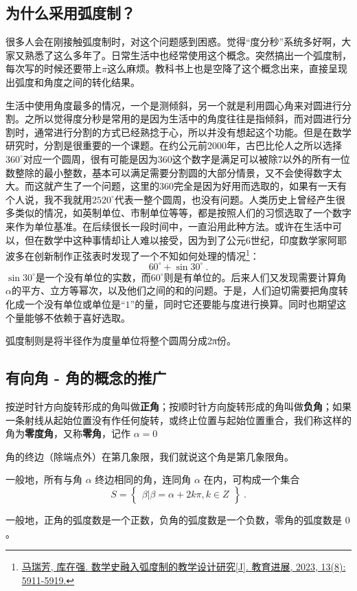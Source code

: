 \subsection{为什么采用弧度制？}

很多人会在刚接触弧度制时，对这个问题感到困惑。觉得“度分秒”系统多好啊，大家又熟悉了这么多年了。日常生活中也经常使用这个概念。突然搞出一个弧度制，每次写的时候还要带上$\pi$这么麻烦。教科书上也是空降了这个概念出来，直接呈现出弧度和角度之间的转化结果。

生活中使用角度最多的情况，一个是测倾斜，另一个就是利用圆心角来对圆进行分割。之所以觉得度分秒是常用的是因为生活中的角度往往是指倾斜，而对圆进行分割时，通常进行分割的方式已经熟捻于心，所以并没有想起这个功能。但是在数学研究时，分割是很重要的一个课题。在约公元前2000年，古巴比伦人之所以选择$360^\circ$对应一个圆周，很有可能是因为360这个数字是满足可以被除7以外的所有一位数整除的最小整数，基本可以满足需要分割圆的大部分情景，又不会使得数字太大。而这就产生了一个问题，这里的360完全是因为好用而选取的，如果有一天有个人说，我不我就用$2520^\circ$代表一整个圆周，也没有问题。人类历史上曾经产生很多类似的情况，如英制单位、市制单位等等，都是按照人们的习惯选取了一个数字来作为单位基准。在后续很长一段时间中，一直沿用此种方法。或许在生活中可以，但在数学中这种事情却让人难以接受，因为到了公元6世纪，印度数学家阿耶波多在创新制作正弦表时发现了一个不知如何处理的情况\footnote{\href{https://www.hanspub.org/journal/PaperInformation?paperID=71063&utm_source=chatgpt.com}{马瑞芳, 库在强. 数学史融入弧度制的教学设计研究[J]. 教育进展, 2023, 13(8): 5911-5919.}}：
\begin{equation}
60^\circ+\sin30^\circ~.
\end{equation}
$\sin30^\circ$是一个没有单位的实数，而$60^\circ$则是有单位的。后来人们又发现需要计算角$\alpha$的平方、立方等幂次，以及他们之间的和的问题。于是，人们迫切需要把角度转化成一个没有单位或单位是“$1$”的量，同时它还要能与度进行换算。同时也期望这个量能够不依赖于喜好选取。

弧度制则是将半径作为度量单位将整个圆周分成2π份。

\subsection{有向角 - 角的概念的推广}


按逆时针方向旋转形成的角叫做\textbf{正角}；按顺时针方向旋转形成的角叫做\textbf{负角}；如果一条射线从起始位置没有作任何旋转，或终止位置与起始位置重合，我们称这样的角为\textbf{零度角}，又称\textbf{零角}，记作 $\alpha = 0$

角的终边（除端点外）在第几象限，我们就说这个角是第几象限角。

一般地，所有与角 $\alpha$ 终边相同的角，连同角 $\alpha$ 在内，可构成一个集合
\begin{equation}
S = \begin{Bmatrix} \beta|\beta=\alpha+2k\pi,k \in Z \end{Bmatrix}~.
\end{equation}


一般地，正角的弧度数是一个正数，负角的弧度数是一个负数，零角的弧度数是 $0$。
